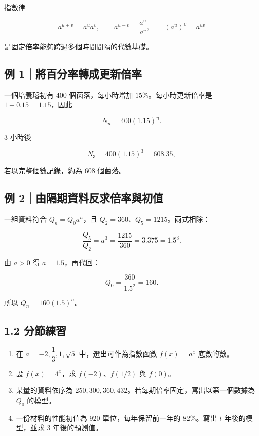 \documentclass[11pt,a4paper]{article}
\providecommand{\tightlist}{%
  \setlength{\itemsep}{0pt}\setlength{\parskip}{0pt}}
\begin{document}
指數律

\[
a^{u+v}=a^ua^v,\qquad a^{u-v}=\frac{a^u}{a^v},\qquad (a^u)^v=a^{uv}
\]

是固定倍率能夠跨過多個時間間隔的代數基礎。

\subsection{例 1｜將百分率轉成更新倍率}\label{ux4f8b-1ux5c07ux767eux5206ux7387ux8f49ux6210ux66f4ux65b0ux500dux7387}

一個培養璿初有 \(400\) 個菌落，每小時增加 \(15\%\)。每小時更新倍率是 \(1+0.15=1.15\)，因此

\[
N_n=400(1.15)^n.
\]

\(3\) 小時後

\[
N_3=400(1.15)^3=608.35,
\]

若以完整個數記錄，約為 \(608\) 個菌落。

\subsection{例 2｜由隔期資料反求倍率與初值}\label{ux4f8b-2ux7531ux9694ux671fux8cc7ux6599ux53cdux6c42ux500dux7387ux8207ux521dux503c}

一組資料符合 \(Q_n=Q_0a^n\)，且 \(Q_2=360\)、\(Q_5=1215\)。兩式相除：

\[
\frac{Q_5}{Q_2}=a^3=\frac{1215}{360}=3.375=1.5^3.
\]

由 \(a>0\) 得 \(a=1.5\)，再代回：

\[
Q_0=\frac{360}{1.5^2}=160.
\]

所以 \(Q_n=160(1.5)^n\)。

\subsection{1.2 分節練習}\label{ux5206ux7bc0ux7df4ux7fd2}

\begin{enumerate}
\def\labelenumi{\arabic{enumi}.}
\tightlist
\item
  在 \(a=-2,\dfrac13,1,\sqrt5\) 中，選出可作為指數函數 \(f(x)=a^x\) 底數的數。
\item
  設 \(f(x)=4^x\)，求 \(f(-2)\)、\(f(1/2)\) 與 \(f(0)\)。
\item
  某量的資料依序為 \(250,300,360,432\)。若每期倍率固定，寫出以第一個數據為 \(Q_0\) 的模型。
\item
  一份材料的性能初值為 \(920\) 單位，每年保留前一年的 \(82\%\)。寫出 \(t\) 年後的模型，並求 \(3\) 年後的預測值。
\end{enumerate}
\end{document}
